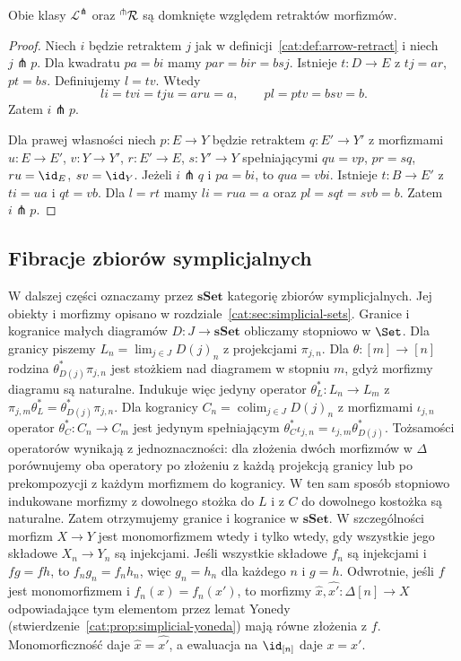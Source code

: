 \begin{stwierdzenie}\label{cat:prop:lifting-retract}
Obie klasy $\mathcal L^\pitchfork$ oraz $\vphantom{R}^\pitchfork\mathcal R$ są domknięte względem retraktów morfizmów.
\end{stwierdzenie}
\begin{proof}
Niech $i$ będzie retraktem $j$ jak w definicji~\ref{cat:def:arrow-retract} i niech $j\pitchfork p$. Dla kwadratu $pa=bi$ mamy $par=bir=bsj$. Istnieje $t:D\to E$ z $tj=ar$, $pt=bs$. Definiujemy $l=tv$. Wtedy
\[
 li=tvi=tju=aru=a,\qquad pl=ptv=bsv=b.
\]
Zatem $i\pitchfork p$.

Dla prawej własności niech $p:E\to Y$ będzie retraktem $q:E'\to Y'$ z morfizmami $u:E\to E'$, $v:Y\to Y'$, $r:E'\to E$, $s:Y'\to Y$ spełniającymi $qu=vp$, $pr=sq$, $ru=\id_E$, $sv=\id_Y$. Jeżeli $i\pitchfork q$ i $pa=bi$, to $qua=vbi$. Istnieje $t:B\to E'$ z $ti=ua$ i $qt=vb$. Dla $l=rt$ mamy $li=rua=a$ oraz $pl=sqt=svb=b$. Zatem $i\pitchfork p$.
\end{proof}

\subsection{Fibracje zbiorów symplicjalnych}

W dalszej części oznaczamy przez $\mathbf{sSet}$ kategorię zbiorów symplicjalnych. Jej obiekty i morfizmy opisano w rozdziale~\ref{cat:sec:simplicial-sets}. Granice i kogranice małych diagramów $D:J\to\mathbf{sSet}$ obliczamy stopniowo w $\Set$. Dla granicy piszemy $L_n=\lim_{j\in J}D(j)_n$ z projekcjami $\pi_{j,n}$. Dla $\theta:[m]\to[n]$ rodzina $\theta^*_{D(j)}\pi_{j,n}$ jest stożkiem nad diagramem w stopniu $m$, gdyż morfizmy diagramu są naturalne. Indukuje więc jedyny operator $\theta_L^*:L_n\to L_m$ z $\pi_{j,m}\theta_L^*=\theta^*_{D(j)}\pi_{j,n}$. Dla kogranicy $C_n=\operatorname{colim}_{j\in J}D(j)_n$ z morfizmami $\iota_{j,n}$ operator $\theta_C^*:C_n\to C_m$ jest jedynym spełniającym $\theta_C^*\iota_{j,n}=\iota_{j,m}\theta_{D(j)}^*$. Tożsamości operatorów wynikają z jednoznaczności: dla złożenia dwóch morfizmów w $\Delta$ porównujemy oba operatory po złożeniu z każdą projekcją granicy lub po prekompozycji z każdym morfizmem do kogranicy. W ten sam sposób stopniowo indukowane morfizmy z dowolnego stożka do $L$ i z $C$ do dowolnego kostożka są naturalne. Zatem otrzymujemy granice i kogranice w $\mathbf{sSet}$. W szczególności morfizm $X\to Y$ jest monomorfizmem wtedy i tylko wtedy, gdy wszystkie jego składowe $X_n\to Y_n$ są injekcjami. Jeśli wszystkie składowe $f_n$ są injekcjami i $fg=fh$, to $f_ng_n=f_nh_n$, więc $g_n=h_n$ dla każdego $n$ i $g=h$. Odwrotnie, jeśli $f$ jest monomorfizmem i $f_n(x)=f_n(x')$, to morfizmy $\widehat x,\widehat{x'}:\Delta[n]\to X$ odpowiadające tym elementom przez lemat Yonedy (stwierdzenie~\ref{cat:prop:simplicial-yoneda}) mają równe złożenia z $f$. Monomorficzność daje $\widehat x=\widehat{x'}$, a ewaluacja na $\id_{[n]}$ daje $x=x'$.

